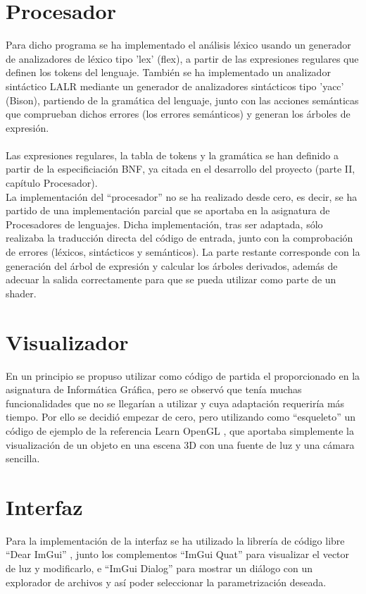\section*{Procesador}
Para dicho programa se ha implementado el análisis léxico usando un generador de analizadores de léxico tipo 'lex' (flex), a partir de las expresiones regulares que definen los tokens del lenguaje. También se ha implementado un analizador sintáctico LALR mediante un generador de analizadores sintácticos tipo 'yacc' (Bison), partiendo de la gramática del lenguaje, junto con las acciones semánticas que comprueban dichos errores (los errores semánticos) y generan los árboles de expresión.\\
\\Las expresiones regulares, la tabla de tokens y la gramática se han definido a partir de la especificiación BNF, ya citada en el desarrollo del proyecto (parte II, capítulo Procesador).
\\La implementación del ``procesador'' no se ha realizado desde cero, es decir, se ha partido de una implementación parcial que se aportaba en la asignatura de Procesadores de lenguajes. Dicha implementación, tras ser adaptada, sólo realizaba la traducción directa del código de entrada, junto con la comprobación de errores (léxicos, sintácticos y semánticos). La parte restante corresponde con la generación del árbol de expresión y calcular los árboles derivados, además de adecuar la salida correctamente para que se pueda utilizar como parte de un shader.\\

\section*{Visualizador}
En un principio se propuso utilizar como código de partida el proporcionado en la asignatura de Informática Gráfica, pero se observó que tenía muchas funcionalidades que no se llegarían a utilizar y cuya adaptación requeriría más tiempo. Por ello se decidió empezar de cero, pero utilizando como ``esqueleto'' un código de ejemplo de la referencia Learn OpenGL \cite{LearnOGL}, que aportaba simplemente la visualización de un objeto en una escena $3$D con una fuente de luz y una cámara sencilla.

\section*{Interfaz}
Para la implementación de la interfaz se ha utilizado la librería de código libre ``Dear ImGui'' \cite{DearImGui}, junto los complementos ``ImGui Quat'' \cite{LVector} para visualizar el vector de luz y modificarlo, e ``ImGui Dialog'' \cite{Dialog} para mostrar un diálogo con un explorador de archivos y así poder seleccionar la parametrización deseada.

